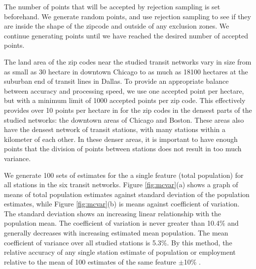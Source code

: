 \documentclass[11pt]{article}
\begin{document}
The number of points that will be accepted by rejection sampling is set beforehand. We generate random points, and use rejection sampling to see if they are inside the shape of the zipcode and outside of any exclusion zones. We continue generating points until we have reached the desired number of accepted points.

The land area of the zip codes near the studied transit networks vary in size from as small as 30 hectare in downtown Chicago to as much as 18100 hectares at the suburban end of transit lines in Dallas. To provide an appropriate balance between accuracy and processing speed, we use one accepted point per hectare, but with a minimum limit of 1000 accepted points per zip code. This effectively provides over 10 points per hectare in for the zip codes in the densest parts of the studied networks: the downtown areas of Chicago and Boston. These areas also have the densest network of transit stations, with many stations within a kilometer of each other. In these denser areas, it is important to have enough points that the division of points between stations does not result in too much variance. 

We generate 100 sets of estimates for the a single feature (total population) for all stations in the six transit networks. Figure \ref{fig:mcvar}(a) shows a graph of means of total population estimates against standard deviation of the population estimates, while Figure \ref{fig:mcvar}(b) is means against coefficient of variation. The standard deviation shows an increasing linear relationship with the population mean. The coefficient of variation is never greater than 10.4\% and generally decreases with increasing estimated mean population. The mean coefficient of variance over all studied stations is 5.3\%. By this method, the relative accuracy of any single station estimate of population or employment relative to the mean of 100 estimates of the same feature $\pm$10\% .
\end{document}
